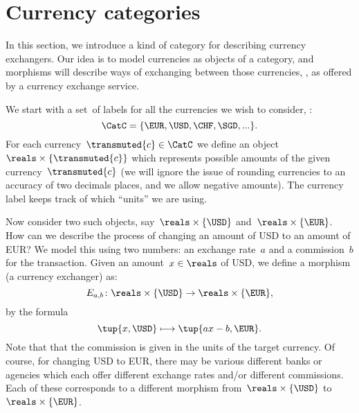 \section{Currency categories}
\label{sec:currency_cat}
In this section, we introduce a kind of category for describing currency exchangers. Our idea is to model currencies as objects of a category, and morphisms will describe ways of exchanging between those currencies, , as offered by a currency exchange service.

We start with a set~\CatC of labels for all the currencies we wish to consider, :
\begin{equation*}
  \CatC = \{ \EUR, \USD, \CHF, \SGD, ... \}.
\end{equation*}
For each currency~$\transmuted{c} \in \CatC$ we define an object~$\reals \times \{\transmuted{c}\}$ which represents possible amounts of the given currency~$\transmuted{c}$ (we will ignore the issue of rounding currencies to an accuracy of two decimals places, and we allow negative amounts). The currency label keeps track of which ``units'' we are using.

Now consider two such objects, say~$\reals \times \{\USD\}$ and~$\reals \times \{\EUR\}$. How can we describe the process of changing an amount of USD to an amount of EUR? We model this using two numbers: an exchange rate~$a$ and a commission~$b$ for the transaction. Given an amount~$x \in \reals$ of USD, we define a morphism (a currency exchanger) as:
\begin{equation*}
  E_{a,b} \colon \reals \times \{\USD\} \rightarrow \reals \times \{\EUR\},
\end{equation*}
by the formula
\begin{equation*}
  \tup{x, \USD} \longmapsto \tup{ax - b, \EUR}.
\end{equation*}
Note that that the commission is given in the units of the target currency. Of course, for changing USD to EUR, there may be various different banks or agencies which each offer different exchange rates and/or different commissions. Each of these corresponds to a different morphism from~$\reals \times \{\USD\}$ to~$\reals \times \{\EUR\}$.

